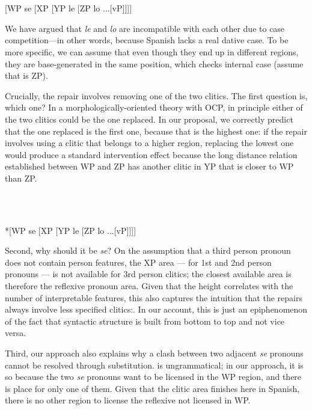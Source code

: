 \documentclass[output=paper,colorlinks,citecolor=brown]{./langscibook}
\begin{document}
\ea%
    \label{ex:key:23}
    \gll\\
        \\
    \glt
    \z

         [WP  se  [XP   [YP  le  [ZP  lo ...[vP]]]]

We have argued that \textit{le} and \textit{lo} are incompatible with each other due to case competition—in other words, because Spanish lacks a real dative case. To be more specific, we can assume that even though they end up in different regions, they are base-generated in the same position, which checks internal case (assume that is ZP). 

Crucially, the repair involves removing one of the two clitics. The first question is, which one? In a morphologically-oriented theory with OCP, in principle either of the two clitics could be the one replaced. In our proposal, we correctly predict that the one replaced is the first one, because that is the highest one: if the repair involves using a clitic that belongs to a higher region, replacing the lowest one would produce a standard intervention effect because the long distance relation established between WP and ZP has another clitic in YP that is closer to WP than ZP.

\ea%
    \label{ex:key:24}
    \gll\\
        \\
    \glt
    \z

          *[WP   se  [XP  [YP  le  [ZP  lo ...[vP]]]]

Second, why should it be \textit{se}? On the assumption that a third person pronoun does not contain person features, the XP area — for 1st and 2nd person pronouns — is not available for 3rd person clitics; the closest available area is therefore the reflexive pronoun area. Given that the height correlates with the number of interpretable features, this also captures the intuition that the repairs always involve less specified clitics:. In our account, this is just an epiphenomenon of the fact that syntactic structure is built from bottom to top and not vice versa.

Third, our approach also explains why a clash between two adjacent \textit{se} pronouns cannot be resolved through substitution.  is ungrammatical; in our approach, it is so because the two \textit{se} pronouns want to be licensed in the WP region, and there is place for only one of them. Given that the clitic area finishes here in Spanish, there is no other region to license the reflexive not licensed in WP.
\end{document}
